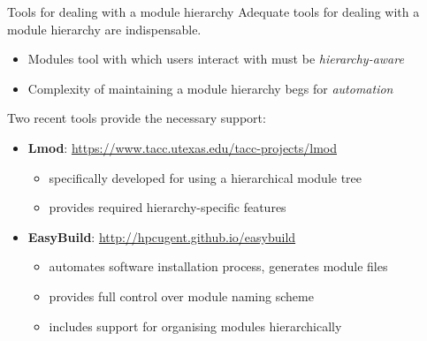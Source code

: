 \documentclass[10pt,xcolor={usenames,dvipsnames}]{beamer}
\begin{document}

\begin{frame}{Tools for dealing with a module hierarchy}
    Adequate tools for dealing with a module hierarchy are indispensable.
    \begin{itemize}
        \item
            Modules tool with which users interact with must be \textit{hierarchy-aware}
        \item
            Complexity of maintaining a module hierarchy begs for \textit{automation}
    \end{itemize}
    Two recent tools provide the necessary support:
    \begin{itemize}    
    \item
        \textbf{Lmod}: \url{https://www.tacc.utexas.edu/tacc-projects/lmod}
        \begin{itemize}
            \item specifically developed for using a hierarchical module tree
            \item provides required hierarchy-specific features
        \end{itemize}
    \item
        \textbf{EasyBuild}: \url{http://hpcugent.github.io/easybuild}
        \begin{itemize}
            \item automates software installation process, generates module files
            \item provides full control over module naming scheme
            \item includes support for organising modules hierarchically
        \end{itemize}
    \end{itemize}
\end{frame}

\end{document}
